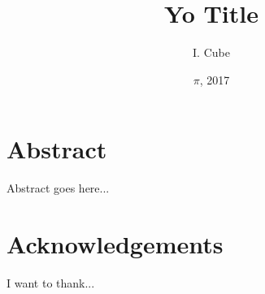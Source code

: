 \documentclass[12pt]{report}
\title{Yo Title}
\author{I. Cube}
\date{$\pi$, 2017}
\begin{document}
\maketitle

\chapter*{Abstract}
Abstract goes here...

\chapter*{Acknowledgements}
I want to thank...

\tableofcontents




\end{document}
